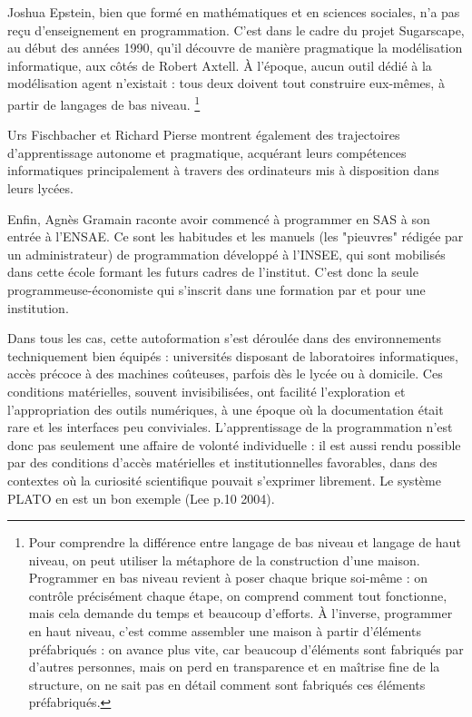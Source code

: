 Joshua Epstein, bien que formé en mathématiques et en sciences sociales, n’a pas reçu d’enseignement en programmation. C’est dans le cadre du projet Sugarscape, au début des années 1990, qu’il découvre de manière pragmatique la modélisation informatique, aux côtés de Robert Axtell. À l’époque, aucun outil dédié à la modélisation agent n’existait : tous deux doivent tout construire eux-mêmes, à partir de langages de bas niveau. \footnote{Pour comprendre la différence entre langage de bas niveau et langage de haut niveau, on peut utiliser la métaphore de la construction d’une maison. Programmer en bas niveau revient à poser chaque brique soi-même : on contrôle précisément chaque étape, on comprend comment tout fonctionne, mais cela demande du temps et beaucoup d’efforts. À l’inverse, programmer en haut niveau, c’est comme assembler une maison à partir d’éléments préfabriqués : on avance plus vite, car beaucoup d'éléments sont fabriqués par d'autres personnes, mais on perd en transparence et en maîtrise fine de la structure, on ne sait pas en détail comment sont fabriqués ces éléments préfabriqués.} 

Urs Fischbacher et Richard Pierse montrent également des trajectoires d’apprentissage autonome et pragmatique, acquérant leurs compétences informatiques principalement à travers des ordinateurs mis à disposition dans leurs lycées. 

Enfin, Agnès Gramain raconte avoir commencé à programmer en SAS à son entrée à l’ENSAE. Ce sont les habitudes et les manuels (les "pieuvres" rédigée par un administrateur) de programmation développé à l’INSEE, qui sont mobilisés dans cette école formant les futurs cadres de l’institut. C'est donc la seule programmeuse-économiste qui s'inscrit dans une formation par et pour une institution. 

Dans tous les cas, cette autoformation s’est déroulée dans des environnements techniquement bien équipés : universités disposant de laboratoires informatiques, accès précoce à des machines coûteuses, parfois dès le lycée ou à domicile. Ces conditions matérielles, souvent invisibilisées, ont facilité l’exploration et l’appropriation des outils numériques, à une époque où la documentation était rare et les interfaces peu conviviales. L’apprentissage de la programmation n’est donc pas seulement une affaire de volonté individuelle : il est aussi rendu possible par des conditions d’accès matérielles et institutionnelles favorables, dans des contextes où la curiosité scientifique pouvait s’exprimer librement. Le système PLATO en est un bon exemple (Lee p.10 2004\cite{leeHistoryComputingEducation2004}).


